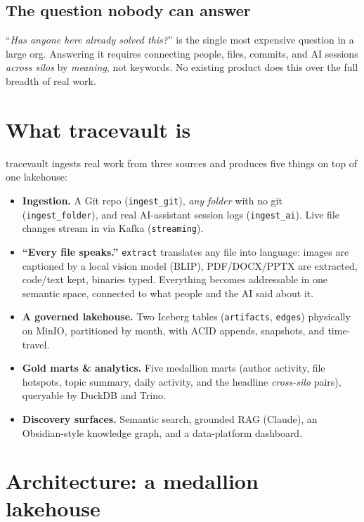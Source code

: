 \documentclass[11pt]{article}
\newcommand{\code}[1]{{\small\texttt{#1}}}
\begin{document}
\subsection{The question nobody can answer}
``\emph{Has anyone here already solved this?}'' is the single most expensive question in a large org.
Answering it requires connecting people, files, commits, and AI sessions \emph{across silos} by
\emph{meaning}, not keywords. No existing product does this over the full breadth of real work.

\section{What tracevault is}

tracevault ingests real work from three sources and produces five things on top of one lakehouse:

\begin{itemize}[leftmargin=1.4em,itemsep=2pt]
  \item \textbf{Ingestion.} A Git repo (\code{ingest\_git}), \emph{any folder} with no git
  (\code{ingest\_folder}), and real AI-assistant session logs (\code{ingest\_ai}). Live file changes
  stream in via Kafka (\code{streaming}).
  \item \textbf{``Every file speaks.''} \code{extract} translates any file into language: images are
  captioned by a local vision model (BLIP), PDF/DOCX/PPTX are extracted, code/text kept, binaries
  typed. Everything becomes addressable in one semantic space, connected to what people and the AI
  said about it.
  \item \textbf{A governed lakehouse.} Two Iceberg tables (\code{artifacts}, \code{edges}) physically
  on MinIO, partitioned by month, with ACID appends, snapshots, and time-travel.
  \item \textbf{Gold marts \& analytics.} Five medallion marts (author activity, file hotspots, topic
  summary, daily activity, and the headline \emph{cross-silo} pairs), queryable by DuckDB and Trino.
  \item \textbf{Discovery surfaces.} Semantic search, grounded RAG (Claude), an Obsidian-style
  knowledge graph, and a data-platform dashboard.
\end{itemize}

\section{Architecture: a medallion lakehouse}
\end{document}

